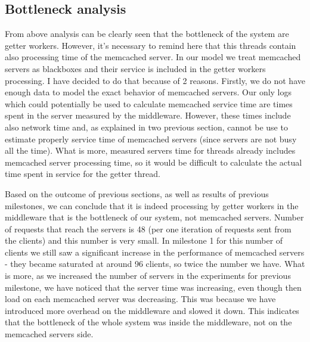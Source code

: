 \documentclass[11pt]{article}
\begin{document}
\subsection{Bottleneck analysis}
\label{sec:bottleneck}

From above analysis can be clearly seen that the bottleneck of the system are getter workers. However, it's necessary to remind here that this threads contain also processing time of the memcached server. In our model we treat memcached servers as blackboxes and their service is included in the getter workers processing. I have decided to do that because of 2 reasons. Firstly, we do not have enough data to model the exact behavior of memcached servers. Our only logs which could potentially be used to calculate memcached service time are times spent in the server measured by the middleware. However, these times include also network time and, as explained in two previous section, cannot be use to estimate properly service time of memcached servers (since servers are not busy all the time). What is more, measured servers time for threads already includes memcached server processing time, so it would be difficult to calculate the actual time spent in service for the getter thread.

Based on the outcome of previous sections, as well as results of previous milestones, we can conclude that it is indeed processing by getter workers in the middleware that is the bottleneck of our system, not memcached servers. Number of requests that reach the servers is 48 (per one iteration of requests sent from the clients) and this number is very small. In milestone 1 for this number of clients we still saw a significant increase in the performance of memcached servers - they became saturated at around 96 clients, so twice the number we have. What is more, as we increased the number of servers in the experiments for previous milestone, we have noticed that the server time was increasing, even though then load on each memcached server was decreasing. This was because we have introduced more overhead on the middleware and slowed it down. This indicates that the bottleneck of the whole system was inside the middleware, not on the memcached servers side.
\end{document}

